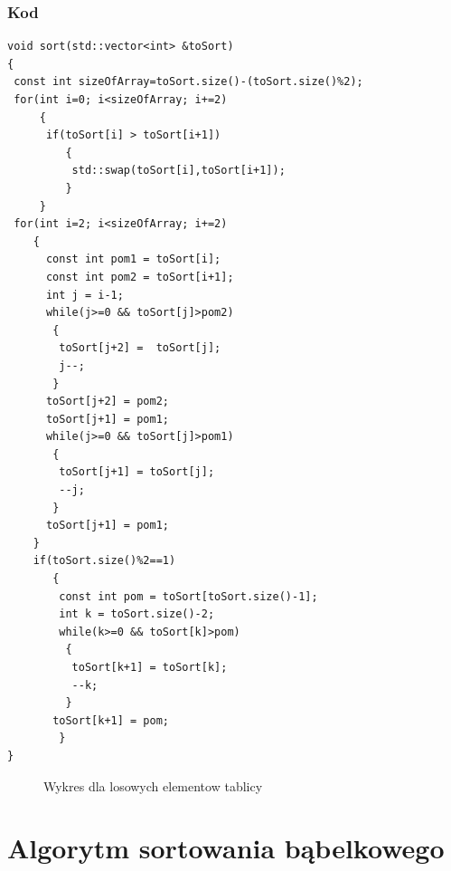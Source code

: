 \subsubsection*{Kod}
\begin{lstlisting}
void sort(std::vector<int> &toSort)
{
 const int sizeOfArray=toSort.size()-(toSort.size()%2);
 for(int i=0; i<sizeOfArray; i+=2)
     {
      if(toSort[i] > toSort[i+1])
         {
          std::swap(toSort[i],toSort[i+1]);
         }
     }
 for(int i=2; i<sizeOfArray; i+=2)
    {
      const int pom1 = toSort[i];
      const int pom2 = toSort[i+1];
      int j = i-1;
	  while(j>=0 && toSort[j]>pom2)
	   {
	    toSort[j+2] =  toSort[j];
	    j--;
	   }
	  toSort[j+2] = pom2;
	  toSort[j+1] = pom1;
	  while(j>=0 && toSort[j]>pom1)
	   {
	    toSort[j+1] = toSort[j];
	    --j;
	   }
	  toSort[j+1] = pom1;
	}
	if(toSort.size()%2==1)
	   {
	    const int pom = toSort[toSort.size()-1];
	    int k = toSort.size()-2;
	    while(k>=0 && toSort[k]>pom)
	     {
	      toSort[k+1] = toSort[k];
	      --k;
		 }
	   toSort[k+1] = pom;
	    }
}
\end{lstlisting}
\begin{figure}[h!]
  \begin{center}
    \caption{Wykres dla losowych elementow tablicy}
  \end{center}
\end{figure}
\FloatBarrier

\section{Algorytm sortowania bąbelkowego}
